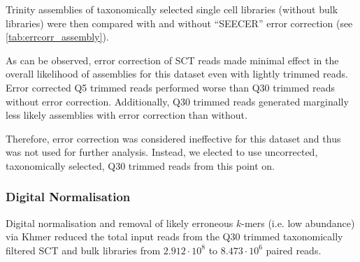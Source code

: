 Trinity assemblies of taxonomically selected single cell libraries 
(without bulk libraries) were then compared with and without ``SEECER'' 
error correction (see \cref{tab:errcorr_assembly}).
\begin{table}[h!]

    \caption[Effect of Error Correction on Assembly]{Naive Trinity assembly of Q5 and Q30 trimmed taxonomically selected single cell libraries
        with and without SEECER error correction. While assembly likelihood increases after
    error correction for Q5 trimmed reads it is still lower than Q30 uncorrected.  For Q30
trimmed reads error correction marginally decreases assembly likelihood.}
    \label{tab:errcorr_assembly}
\end{table}

As can be observed, error correction of SCT reads made minimal effect in the overall likelihood
of assemblies for this dataset even with lightly trimmed reads.  Error corrected Q5
trimmed reads performed worse than Q30 trimmed reads without error correction. 
Additionally, Q30 trimmed reads generated marginally less likely assemblies with 
error correction than without. 

Therefore, error correction
was considered ineffective for this dataset and thus was not 
used for further analysis.  Instead, we elected to use uncorrected, taxonomically selected,
Q30 trimmed reads from this point on. 

\subsubsection{Digital Normalisation} 
Digital normalisation and removal of likely erroneous \(k\)-mers (i.e. low abundance) 
via Khmer reduced the total input reads from the Q30 trimmed taxonomically
filtered SCT and bulk libraries from 
\(2.912\cdot 10^{8}\) to \(8.473\cdot 10^6\) paired reads.

